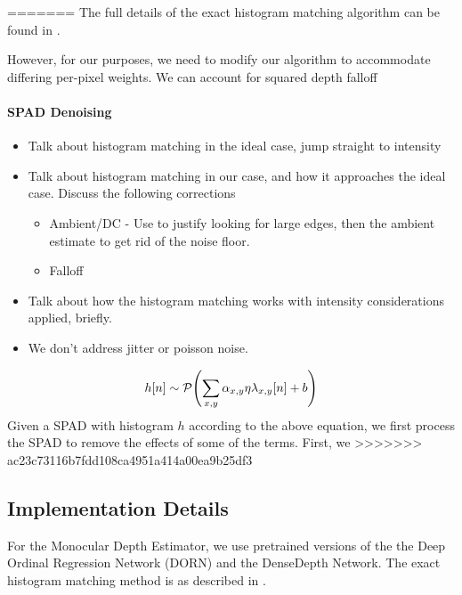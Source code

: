 =======
The full details of the exact histogram matching algorithm can be found in
\cite{Morovic2002}.

However, for our purposes, we need to modify our algorithm to accommodate
differing per-pixel weights. We can account for squared depth falloff

\paragraph{SPAD Denoising}
\begin{itemize}
  \item Talk about histogram matching in the ideal case, jump straight to intensity 
  \item Talk about histogram matching in our case, and how it approaches the
    ideal case. Discuss the following corrections 
    \begin{itemize}
      \item Ambient/DC - Use \cite{Xin2019} to justify looking for large edges,
        then the ambient estimate to get rid of the noise floor.
      \item Falloff
    \end{itemize}
  \item Talk about how the histogram matching works with intensity
    considerations applied, briefly.
  \item We don't address jitter or poisson noise.
\end{itemize}
\begin{equation}
  h[n] \sim \mathcal{P}\paren*{\sum_{x,y}\alpha_{x,y}\eta \lambda_{x,y}[n] + b} \label{global_hints}
\end{equation}
Given a SPAD with histogram $h$ according to the above equation, we first
process the SPAD to remove the effects of some of the terms. First, we 
>>>>>>> ac23c73116b7fdd108ca4951a414a00ea9b25df3
\subsection{Implementation Details}
For the Monocular Depth Estimator, we use pretrained versions of the
the Deep Ordinal Regression Network (DORN) \cite{} and the DenseDepth Network.
The exact histogram matching method is as described in \cite{}.


